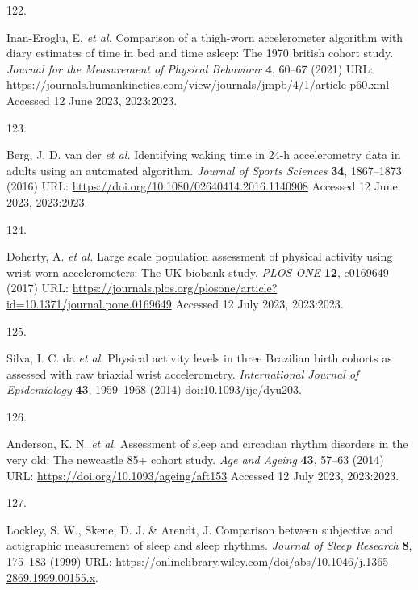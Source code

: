 \documentclass[
  10pt,
]{scrbook}
\newlength{\cslhangindent}
\newlength{\csllabelwidth}
\newlength{\cslentryspacingunit} %
\newenvironment{CSLReferences}[2] %
 {%
  \setlength{\parindent}{0pt}
  \ifodd #1
  \let\oldpar\par
  \def\par{\hangindent=\cslhangindent\oldpar}
  \fi
  \setlength{\parskip}{#2\cslentryspacingunit}
 }%
 {}
\newcommand{\CSLLeftMargin}[1]{\parbox[t]{\csllabelwidth}{#1}}
\newcommand{\CSLRightInline}[1]{\parbox[t]{\linewidth - \csllabelwidth}{#1}\break}
\let\originaltextbf\textbf
\renewcommand{\textbf}[1]{\textcolor{color1}{\originaltextbf{#1}}}
\begin{document}
\begin{CSLReferences}{0}{0}
\leavevmode{}%
\CSLLeftMargin{122. }%
\CSLRightInline{Inan-Eroglu, E. \emph{et al.} Comparison of a thigh-worn
accelerometer algorithm with diary estimates of time in bed and time
asleep: The 1970 british cohort study. \emph{Journal for the Measurement
of Physical Behaviour} \textbf{4}, 60--67 (2021) URL:
\url{https://journals.humankinetics.com/view/journals/jmpb/4/1/article-p60.xml}
Accessed 12 June 2023, 2023:2023.}

\leavevmode{}%
\CSLLeftMargin{123. }%
\CSLRightInline{Berg, J. D. van der \emph{et al.} Identifying waking
time in 24-h accelerometry data in adults using an automated algorithm.
\emph{Journal of Sports Sciences} \textbf{34}, 1867--1873 (2016) URL:
\url{https://doi.org/10.1080/02640414.2016.1140908} Accessed 12 June
2023, 2023:2023.}

\leavevmode{}%
\CSLLeftMargin{124. }%
\CSLRightInline{Doherty, A. \emph{et al.} Large scale population
assessment of physical activity using wrist worn accelerometers: The
{UK} biobank study. \emph{{PLOS} {ONE}} \textbf{12}, e0169649 (2017)
URL:
\url{https://journals.plos.org/plosone/article?id=10.1371/journal.pone.0169649}
Accessed 12 July 2023, 2023:2023.}

\leavevmode{}%
\CSLLeftMargin{125. }%
\CSLRightInline{Silva, I. C. da \emph{et al.} Physical activity levels
in three Brazilian birth cohorts as assessed with raw triaxial wrist
accelerometry. \emph{International Journal of Epidemiology} \textbf{43},
1959--1968 (2014)
doi:\href{https://doi.org/10.1093/ije/dyu203}{10.1093/ije/dyu203}.}

\leavevmode{}%
\CSLLeftMargin{126. }%
\CSLRightInline{Anderson, K. N. \emph{et al.} Assessment of sleep and
circadian rhythm disorders in the very old: The newcastle 85+ cohort
study. \emph{Age and Ageing} \textbf{43}, 57--63 (2014) URL:
\url{https://doi.org/10.1093/ageing/aft153} Accessed 12 July 2023,
2023:2023.}

\leavevmode{}%
\CSLLeftMargin{127. }%
\CSLRightInline{Lockley, S. W., Skene, D. J. \& Arendt, J. Comparison
between subjective and actigraphic measurement of sleep and sleep
rhythms. \emph{Journal of Sleep Research} \textbf{8}, 175--183 (1999)
URL:
\url{https://onlinelibrary.wiley.com/doi/abs/10.1046/j.1365-2869.1999.00155.x}.}


\end{CSLReferences}
\end{document}
